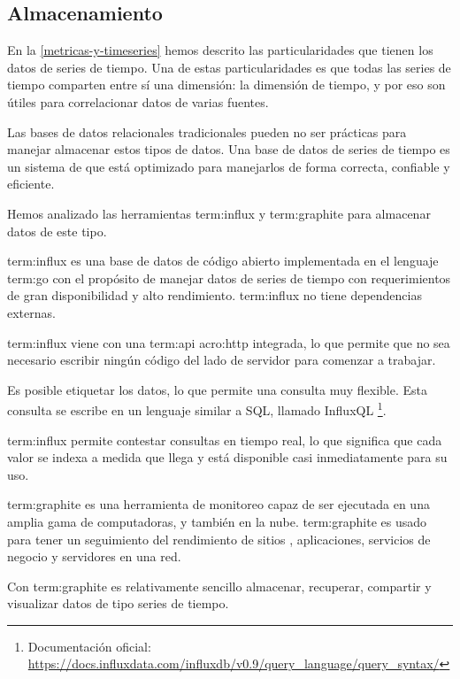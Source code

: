 \subsection{Almacenamiento}
\label{almacenamiento}

En la \autoref{metricas-y-timeseries} hemos descrito las particularidades que
tienen los datos de series de tiempo. Una de estas particularidades es que
todas las series de tiempo comparten entre sí una dimensión: la dimensión de
tiempo, y por eso son útiles para correlacionar datos de varias fuentes.

Las bases de datos relacionales tradicionales pueden no ser prácticas para
manejar almacenar estos tipos de datos. Una base de datos de series de tiempo
es un sistema de  que está optimizado para manejarlos de forma
correcta, confiable y eficiente.

Hemos analizado las herramientas \gls{term:influx} y \gls{term:graphite} para
almacenar datos de este tipo.

\gls{term:influx} es una base de datos de código abierto implementada en el
lenguaje \gls{term:go} con el propósito de manejar datos de series de tiempo
con requerimientos de gran disponibilidad y alto rendimiento. \gls{term:influx}
no tiene dependencias externas.

\gls{term:influx} viene con una \gls{term:api} \gls{acro:http} integrada, lo
que permite que no sea necesario escribir ningún código del lado de servidor
para comenzar a trabajar. \cite{influxdb}

Es posible etiquetar los datos, lo que permite una consulta muy flexible. Esta
consulta se escribe en un lenguaje similar a SQL, llamado InfluxQL
\footnote{Documentación oficial: \url{https://docs.influxdata.com/influxdb/v0.9/query_language/query_syntax/}}.

\gls{term:influx} permite contestar consultas en tiempo real, lo que significa
que cada valor se indexa a medida que llega y está disponible casi
inmediatamente para su uso.

\gls{term:graphite} es una herramienta de monitoreo capaz de ser ejecutada en
una amplia gama de computadoras, y también en la nube. \gls{term:graphite} es
usado para tener un seguimiento del rendimiento de sitios ,
aplicaciones, servicios de negocio y servidores en una red.

Con \gls{term:graphite} es relativamente sencillo almacenar, recuperar,
compartir y visualizar datos de tipo series de tiempo.

